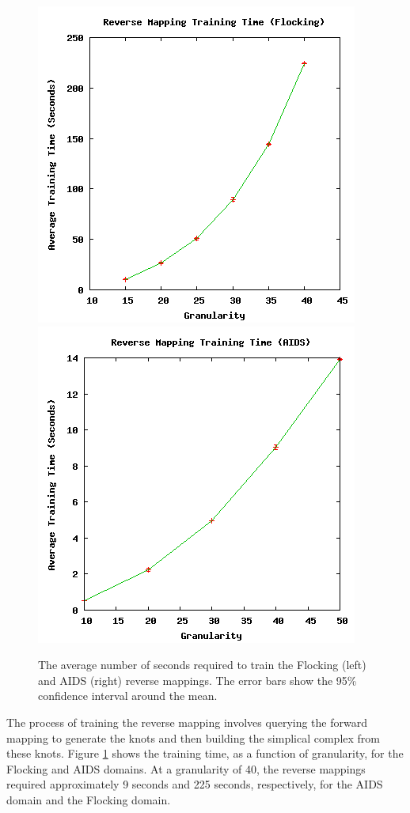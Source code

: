 \begin{figure}[ht]
\centering
\includegraphics[scale=.5]{images/results_flocking/rmtraining.png}
\includegraphics[scale=.5]{images/results_aids/aids-rmtraining.png}
\caption{The average number of seconds required to train the Flocking (left) and AIDS (right) reverse mappings.
The error bars show the 95\% confidence interval around the mean.}
\label{fig:farmtraining}
\end{figure}



The process of training the reverse mapping involves querying the forward mapping to generate the knots and then building the simplical complex from these knots.
Figure \ref{fig:farmtraining} shows the training time, as a function of granularity, for the Flocking and AIDS domains.
At a granularity of 40, the reverse mappings required approximately 9 seconds and 225 seconds, respectively, for the AIDS domain and the Flocking domain.

